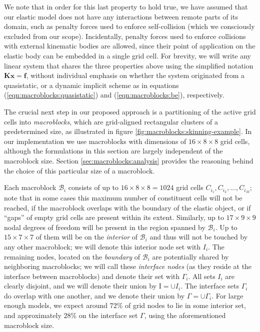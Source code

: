 We note that in order for this last property to hold true, we have
assumed that our elastic model does not have any interactions between
remote parts of its domain, such as penalty forces used to enforce
self-collision (which we consciously excluded from our
scope). Incidentally, penalty forces used to enforce collisions with
external kinematic bodies are allowed, since their point of
application on the elastic body can be embedded in a single grid
cell. For brevity, we will write any linear system that shares the
three properties above using the simplified notation $\mathbf{Kx=f}$,
without individual emphasis on whether the system originated from a
quasistatic, or a dynamic implicit scheme as in equations
(\ref{eqn:macroblocks:quasistatic}) and (\ref{eqn:macroblocks:be}), respectively.

The crucial next step in our proposed approach is a partitioning of
the active grid cells into \emph{macroblocks}, which are grid-aligned
rectangular clusters of a predetermined size, as illustrated in figure
\ref{fig:macroblocks:skinning-example}. In our implementation we use macroblocks
with dimensions of $16\times 8\times 8$ grid cells, although the
formulations in this section are largely independent of the macroblock
size. Section \ref{sec:macroblocks:analysis} provides the reasoning behind the
choice of this particular size of a macroblock.

Each macroblock $\mathcal{B}_i$ consists of up to
$16\times 8\times 8=1024$ grid cells $C_{i_1},C_{i_2},\ldots,C_{i_M}$;
note that in some cases this maximum number of constituent cells will
not be reached, if the macroblock overlaps with the boundary of the
elastic object, or if ``gaps'' of empty grid cells are present within
its extent. Similarly, up to $17\times 9\times 9$ nodal degrees of
freedom will be present in the region spanned by $\mathcal{B}_i$. Up
to $15\times 7\times 7$ of them will be on the \emph{interior} of
$\mathcal{B}_i$ and thus will not be touched by any other macroblock;
we will denote this interior node set with $I_i$. The remaining nodes,
located on the \emph{boundary} of $\mathcal{B}_i$ are potentially
shared by neighboring macroblocks; we will call these \emph{interface
  nodes} (as they reside at the interface between macroblocks) and
denote their set with $\Gamma_i$. All sets $I_i$ are clearly disjoint,
and we will denote their union by $\mathrm{I}=\cup I_i$. The interface
sets $\Gamma_i$ do overlap with one another, and we denote their union
by $\Gamma=\cup\Gamma_i$. For large enough models, we expect around
$72\%$ of grid nodes to lie in some interior set, and approximately
$28\%$ on the interface set $\Gamma$, using the aforementioned
macroblock size.

